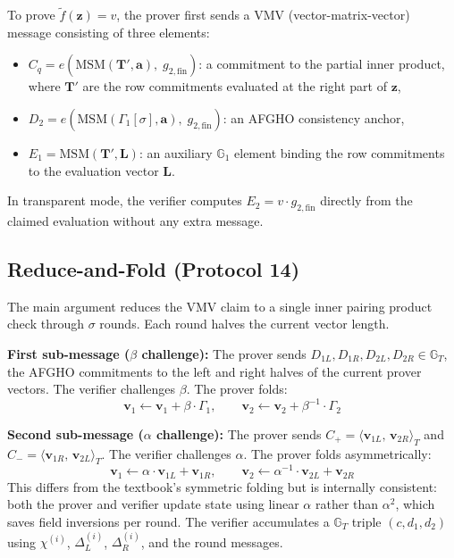 To prove $\tilde{f}(\mathbf{z}) = v$, the prover first sends a VMV
(vector-matrix-vector) message consisting of three elements:
\begin{itemize}
    \item $C_q = e\!\left(\mathrm{MSM}(\mathbf{T}', \mathbf{a}),\;
          g_{2,\mathrm{fin}}\right)$: a commitment to the partial inner
          product, where $\mathbf{T}'$ are the row commitments evaluated at
          the right part of $\mathbf{z}$,
    \item $D_2 = e\!\left(\mathrm{MSM}(\Gamma_1[\sigma], \mathbf{a}),\;
          g_{2,\mathrm{fin}}\right)$: an AFGHO consistency anchor,
    \item $E_1 = \mathrm{MSM}(\mathbf{T}', \mathbf{L})$: an auxiliary
          $\mathbb{G}_1$ element binding the row commitments to the
          evaluation vector $\mathbf{L}$.
\end{itemize}
In transparent mode, the verifier computes $E_2 = v\cdot g_{2,\mathrm{fin}}$
directly from the claimed evaluation without any extra message.

\subsection{Reduce-and-Fold (Protocol 14)}

The main argument reduces the VMV claim to a single inner pairing product
check through $\sigma$ rounds. Each round halves the current vector length.

\textbf{First sub-message ($\beta$ challenge):} The prover sends
$D_{1L}, D_{1R}, D_{2L}, D_{2R} \in \mathbb{G}_T$, the AFGHO commitments to
the left and right halves of the current prover vectors. The verifier
challenges $\beta$. The prover folds:
\begin{equation}
    \mathbf{v}_1 \leftarrow \mathbf{v}_1 + \beta\cdot\Gamma_1, \qquad
    \mathbf{v}_2 \leftarrow \mathbf{v}_2 + \beta^{-1}\cdot\Gamma_2
\end{equation}

\textbf{Second sub-message ($\alpha$ challenge):} The prover sends
$C_+ = \langle \mathbf{v}_{1L},\, \mathbf{v}_{2R}\rangle_T$ and
$C_- = \langle \mathbf{v}_{1R},\, \mathbf{v}_{2L}\rangle_T$.
The verifier challenges $\alpha$. The prover folds asymmetrically:
\begin{equation}
    \mathbf{v}_1 \leftarrow \alpha\cdot\mathbf{v}_{1L} + \mathbf{v}_{1R},
    \qquad
    \mathbf{v}_2 \leftarrow \alpha^{-1}\cdot\mathbf{v}_{2L} + \mathbf{v}_{2R}
\end{equation}
This differs from the textbook's symmetric folding but is internally
consistent: both the prover and verifier update state using linear $\alpha$
rather than $\alpha^2$, which saves field inversions per round. The verifier
accumulates a $\mathbb{G}_T$ triple $(c, d_1, d_2)$ using $\chi^{(i)}$,
$\Delta_L^{(i)}$, $\Delta_R^{(i)}$, and the round messages.

